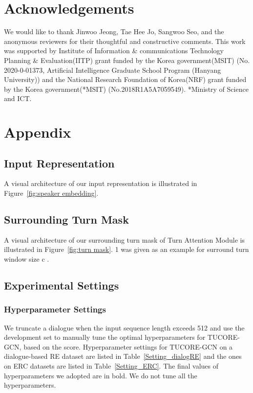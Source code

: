 \documentclass[11pt]{article}
\begin{document}
\section*{Acknowledgements}
We would like to thank Jinwoo Jeong, Tae Hee Jo, Sangwoo Seo, and the anonymous reviewers for their thoughtful and constructive comments. 
This work was supported by Institute of Information \& communications Technology Planning \& Evaluation(IITP) grant funded by the Korea government(MSIT) (No. 2020-0-01373, Artificial Intelligence Graduate School Program (Hanyang University)) and the National Research Foundation of Korea(NRF) grant funded by the Korea government(*MSIT) (No.2018R1A5A7059549). *Ministry of Science and ICT.





\appendix
\section{Appendix}

\subsection{Input Representation}
A visual architecture of our input representation is illustrated in Figure~\ref{fig:speaker embedding}.

\subsection{Surrounding Turn Mask}
A visual architecture of our surrounding turn mask of Turn Attention Module is illustrated in Figure~\ref{fig:turn mask}. 1 was given as an example for surround turn window size c .

\subsection{Experimental Settings}
\subsubsection{Hyperparameter Settings}
We truncate a dialogue when the input sequence length exceeds 512 and use the development set to manually tune the optimal hyperparameters for TUCORE-GCN, based on the  score. Hyperparameter settings for TUCORE-GCN on a dialogue-based RE dataset are listed in Table~\ref{Setting_dialogRE} and the ones on ERC datasets are listed in Table~\ref{Setting_ERC}. The final values of hyperparameters we adopted are in bold. We do not tune all the hyperparameters.
\end{document}
